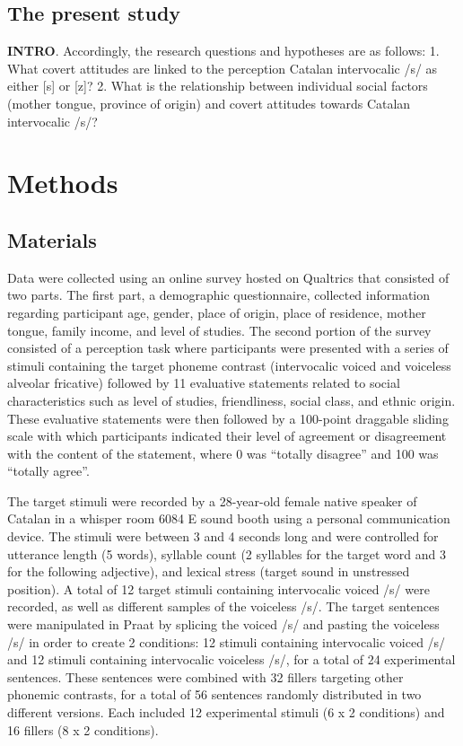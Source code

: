 \documentclass[
  a4paper,
  11pt,
  twocolumn]{article}
\begin{document}
\subsection{The present study}

\textbf{INTRO}. Accordingly, the research questions and hypotheses are
as follows: 1. What covert attitudes are linked to the perception
Catalan intervocalic /s/ as either {[}s{]} or {[}z{]}? 2. What is the
relationship between individual social factors (mother tongue, province
of origin) and covert attitudes towards Catalan intervocalic /s/?

\section{Methods}

\subsection{Materials}

Data were collected using an online survey hosted on Qualtrics that
consisted of two parts. The first part, a demographic questionnaire,
collected information regarding participant age, gender, place of
origin, place of residence, mother tongue, family income, and level of
studies. The second portion of the survey consisted of a perception task
where participants were presented with a series of stimuli containing
the target phoneme contrast (intervocalic voiced and voiceless alveolar
fricative) followed by 11 evaluative statements related to social
characteristics such as level of studies, friendliness, social class,
and ethnic origin. These evaluative statements were then followed by a
100-point draggable sliding scale with which participants indicated
their level of agreement or disagreement with the content of the
statement, where 0 was ``totally disagree'' and 100 was ``totally
agree''.

The target stimuli were recorded by a 28-year-old female native speaker
of Catalan in a whisper room 6084 E sound booth using a personal
communication device. The stimuli were between 3 and 4 seconds long and
were controlled for utterance length (5 words), syllable count (2
syllables for the target word and 3 for the following adjective), and
lexical stress (target sound in unstressed position). A total of 12
target stimuli containing intervocalic voiced /s/ were recorded, as well
as different samples of the voiceless /s/. The target sentences were
manipulated in Praat by splicing the voiced /s/ and pasting the
voiceless /s/ in order to create 2 conditions: 12 stimuli containing
intervocalic voiced /s/ and 12 stimuli containing intervocalic voiceless
/s/, for a total of 24 experimental sentences. These sentences were
combined with 32 fillers targeting other phonemic contrasts, for a total
of 56 sentences randomly distributed in two different versions. Each
included 12 experimental stimuli (6 x 2 conditions) and 16 fillers (8 x
2 conditions).
\end{document}
